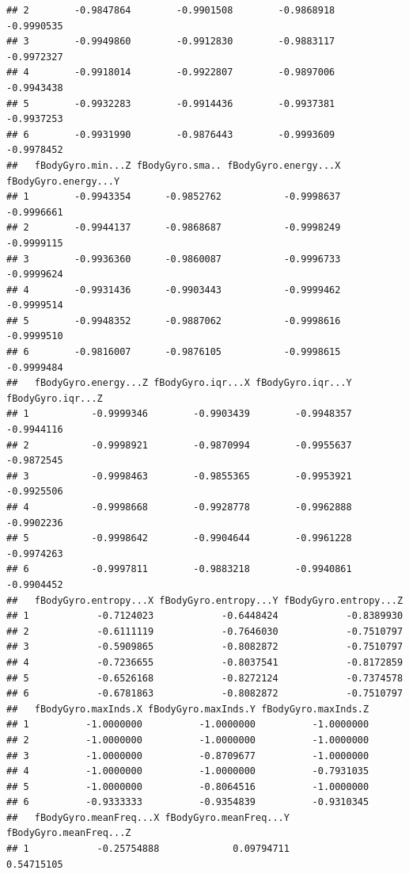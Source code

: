 \documentclass[
]{article}
\begin{document}
\begin{verbatim}
## 2        -0.9847864        -0.9901508        -0.9868918        -0.9990535
## 3        -0.9949860        -0.9912830        -0.9883117        -0.9972327
## 4        -0.9918014        -0.9922807        -0.9897006        -0.9943438
## 5        -0.9932283        -0.9914436        -0.9937381        -0.9937253
## 6        -0.9931990        -0.9876443        -0.9993609        -0.9978452
##   fBodyGyro.min...Z fBodyGyro.sma.. fBodyGyro.energy...X fBodyGyro.energy...Y
## 1        -0.9943354      -0.9852762           -0.9998637           -0.9996661
## 2        -0.9944137      -0.9868687           -0.9998249           -0.9999115
## 3        -0.9936360      -0.9860087           -0.9996733           -0.9999624
## 4        -0.9931436      -0.9903443           -0.9999462           -0.9999514
## 5        -0.9948352      -0.9887062           -0.9998616           -0.9999510
## 6        -0.9816007      -0.9876105           -0.9998615           -0.9999484
##   fBodyGyro.energy...Z fBodyGyro.iqr...X fBodyGyro.iqr...Y fBodyGyro.iqr...Z
## 1           -0.9999346        -0.9903439        -0.9948357        -0.9944116
## 2           -0.9998921        -0.9870994        -0.9955637        -0.9872545
## 3           -0.9998463        -0.9855365        -0.9953921        -0.9925506
## 4           -0.9998668        -0.9928778        -0.9962888        -0.9902236
## 5           -0.9998642        -0.9904644        -0.9961228        -0.9974263
## 6           -0.9997811        -0.9883218        -0.9940861        -0.9904452
##   fBodyGyro.entropy...X fBodyGyro.entropy...Y fBodyGyro.entropy...Z
## 1            -0.7124023            -0.6448424            -0.8389930
## 2            -0.6111119            -0.7646030            -0.7510797
## 3            -0.5909865            -0.8082872            -0.7510797
## 4            -0.7236655            -0.8037541            -0.8172859
## 5            -0.6526168            -0.8272124            -0.7374578
## 6            -0.6781863            -0.8082872            -0.7510797
##   fBodyGyro.maxInds.X fBodyGyro.maxInds.Y fBodyGyro.maxInds.Z
## 1          -1.0000000          -1.0000000          -1.0000000
## 2          -1.0000000          -1.0000000          -1.0000000
## 3          -1.0000000          -0.8709677          -1.0000000
## 4          -1.0000000          -1.0000000          -0.7931035
## 5          -1.0000000          -0.8064516          -1.0000000
## 6          -0.9333333          -0.9354839          -0.9310345
##   fBodyGyro.meanFreq...X fBodyGyro.meanFreq...Y fBodyGyro.meanFreq...Z
## 1            -0.25754888             0.09794711             0.54715105

\end{verbatim}
\end{document}
